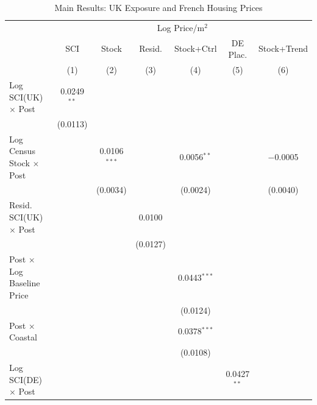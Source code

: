 
\begin{table}[htbp]
   \caption{\label{tab:main} Main Results: UK Exposure and French Housing Prices}
   \bigskip
   \centering
   \begin{tabular}{lcccccc}
      \toprule
       & \multicolumn{6}{c}{Log Price/m$^2$}\\
                                             & SCI           & Stock          & Resid.        & Stock+Ctrl     & DE Plac.      & Stock+Trend \\
                                             & (1)           & (2)            & (3)           & (4)            & (5)           & (6)\\
      \midrule
      Log SCI(UK) $\times$ Post              & 0.0249$^{**}$ &                &               &                &               &   \\
                                             & (0.0113)      &                &               &                &               &   \\
      Log Census Stock $\times$ Post         &               & 0.0106$^{***}$ &               & 0.0056$^{**}$  &               & $-$0.0005\\
                                             &               & (0.0034)       &               & (0.0024)       &               & (0.0040)\\
      Resid. SCI(UK) $\times$ Post           &               &                & 0.0100        &                &               &   \\
                                             &               &                & (0.0127)      &                &               &   \\
      Post $\times$ Log Baseline Price       &               &                &               & 0.0443$^{***}$ &               &   \\
                                             &               &                &               & (0.0124)       &               &   \\
      Post $\times$ Coastal                  &               &                &               & 0.0378$^{***}$ &               &   \\
                                             &               &                &               & (0.0108)       &               &   \\
      Log SCI(DE) $\times$ Post              &               &                &               &                & 0.0427$^{**}$ &   \\

\end{tabular}
\end{table}
